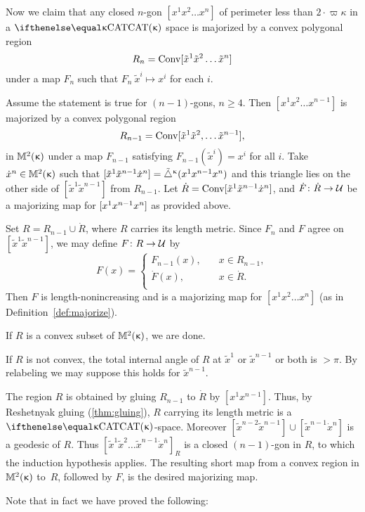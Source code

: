 Now we claim that any closed $n$-gon $[x^1x^2 \dots x^n ]$ of perimeter less than $2\cdot \varpi\kappa$ in a $\CAT{\kappa}$ space  is majorized by a convex polygonal region \[R_n=\Conv[\tilde x^1\tilde x^2\dots\tilde x^n]\]
under a map $F_n$ such that $F_n\:\tilde x^i\mapsto x^i$ for each $i$. 


Assume the statement is true for $(n-1)$-gons, $n\ge 4$.  
Then  $[x^1 x^2 \dots x^{n-1}]$  is majorized by a convex polygonal region 
\[R_{n-1}=\Conv[\tilde x^1 \tilde x^2,\dots \tilde x^{n-1}],\] 
in $\mathbb{M}_{{}}^{2}({\upkappa})$ under a map $F_{n-1}$ satisfying $F_{n-1}(\tilde x^i)=x^i$ for all $i$. 
Take $\dot x^n\in\Lob2{\kappa}$ such that $[{\tilde x^1}{\tilde x^{n-1}}{\dot x^n}]={\tilde\triangle}^{\upkappa}(x^1 x^{n-1} x^n)$ 
and this triangle lies on the other side of $[\tilde x^1\tilde x^{n-1}]$ from $R_{n-1}$.  
Let $\dot R\z=\Conv\trig{\tilde x^1}{\tilde x^{n-1}}{\dot x^n}$, 
and $\dot F\:\dot R\to \spc{U}$ be a majorizing map for $[{ x^1}{x^{n-1}}{ x^n}]$ as provided above.

Set 
$R= R_{n-1}\cup \dot R$, where $R$ carries its length metric.
Since $F_n$ and $F$ agree on $[\tilde x^1 \tilde x^{n-1}]$, we may define $F\:R\to\spc{U}$ by 
\[
F(x)=
\begin{cases}
F_{n-1}(x),\quad & x\in R_{n-1},\\
\dot F(x),\quad & x\in \dot R.\\
\end{cases}
\]
Then $F$ is length-nonincreasing and is a majorizing map for $[x^1 x^2 \dots x^n ]$ (as in Definition~\ref{def:majorize}).

If $R$ is a convex subset of $\mathbb{M}_{{}}^{2}({\upkappa})$, we are done. 

If $R$ is not convex,  the total internal angle of $R$ at $\tilde x^1$ or $ \tilde x^{n-1} $ or both is $>\pi$.  
By relabeling we may suppose this holds for $\tilde x^{n-1}$.  

The region $R$ is obtained by gluing $R_{n-1}$ to $\dot R$ by $[x^1x^{n-1}]$.
Thus, by Reshetnyak gluing (\ref{thm:gluing}), $R$ carrying its length metric is a $\CAT{\kappa}$-space.  
Moreover $[\tilde x^{n-2}\tilde x^{n-1}]\cup[\tilde x^{n-1} \dot x^n]$ is a geodesic of $R$.
Thus $[\tilde x^1 \tilde x^2 \dots \tilde x^{n-1} \dot x^n]_R$ is a closed $(n-1)$-gon in $R$, to which the induction hypothesis applies. The resulting short map from a convex region in $ \mathbb{M}_{{}}^{2}({\upkappa})$ to~$R$, followed by $F$,  is the desired majorizing map.

\medskip

Note that in fact we have proved the following:

